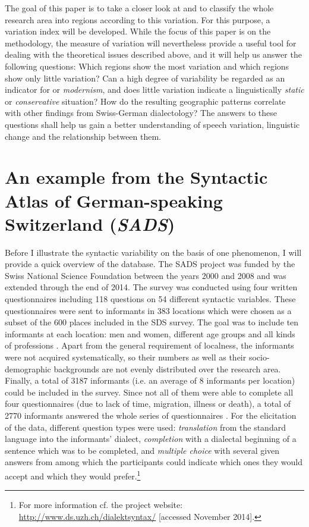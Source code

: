 \documentclass[output=paper]{LSP/langsci}
\begin{document}
The goal of this paper is to take a closer look at  and to classify the whole research area into regions according to this variation. For this purpose, a variation index will be developed. While the focus of this paper is on the methodology, the measure of variation will nevertheless provide a useful tool for dealing with the theoretical issues described above, and it will help us answer the following questions: Which regions show the most variation and which regions show only little variation? Can a high degree of variability be regarded as an indicator for \emph{} or \emph{modernism}, and does little variation indicate a linguistically \emph{static} or \emph{conservative} situation? How do the resulting geographic patterns correlate with other findings from Swiss-German dialectology? The answers to these questions shall help us gain a better understanding of speech variation, linguistic change and the relationship between them.

\section{An example from the Syntactic Atlas of German-speaking Switzerland (\emph{SADS})}

Before I illustrate the syntactic variability on the basis of one phenomenon, I will provide a quick overview of the database. The SADS project was funded by the Swiss National Science Foundation between the years 2000 and 2008 and was extended through the end of 2014. The survey was conducted using four written questionnaires including 118 questions on 54 different syntactic variables. These questionnaires were sent to informants in 383 locations which were chosen as a subset of the 600 places included in the SDS survey. The goal was to include ten informants at each location: men and women, different age groups and all kinds of professions \citep[52]{bucheli_syntactic_2002}. Apart from the general requirement of localness, the informants were not acquired systematically, so their numbers as well as their socio-demographic backgrounds are not evenly distributed over the research area. Finally, a total of 3187 informants (i.e. an average of 8 informants per location) could be included in the survey. Since not all of them were able to complete all four questionnaires (due to lack of time, migration, illness or death), a total of 2770 informants answered the whole series of questionnaires \citep[33]{berger_neue_2008}. For the elicitation of the data, different question types were used: \emph{translation} from the standard language into the informants’ dialect, \emph{completion} with a dialectal beginning of a sentence which was to be completed, and \emph{multiple choice} with several given answers from among which the participants could indicate which ones they would accept and which they would prefer.\footnote{For more information cf. the project website: \url{http://www.ds.uzh.ch/dialektsyntax/} [accessed November 2014].}
\end{document}
